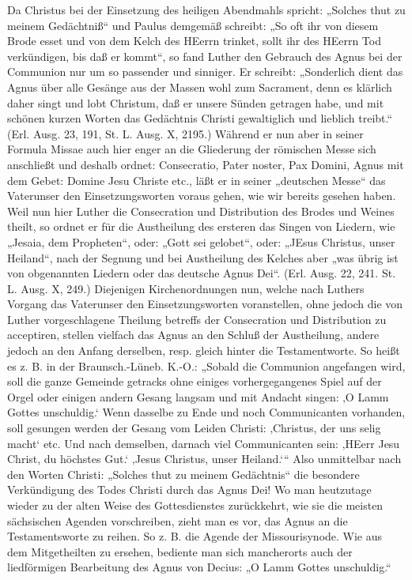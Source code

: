 Da Christus bei der Einsetzung des heiligen Abendmahls spricht: „Solches thut zu meinem Gedächtniß“ und Paulus demgemäß schreibt: „So oft ihr von diesem Brode esset und von dem Kelch des HEerrn trinket, sollt ihr des HEerrn Tod verkündigen, bis daß er kommt“, so fand Luther den Gebrauch des Agnus bei der Communion nur um so passender
und sinniger. Er schreibt: „Sonderlich dient das Agnus über alle Gesänge aus der Massen wohl zum Sacrament, denn es klärlich daher singt und lobt Christum, daß er unsere Sünden getragen habe, und mit schönen kurzen Worten das Gedächtnis Christi gewaltiglich und lieblich treibt.“ (Erl. Ausg. 23, 191, St. L. Ausg. X, 2195.) Während er nun aber in seiner Formula Missae auch hier enger an die Gliederung der römischen Messe sich anschließt und deshalb ordnet: Consecratio, Pater noster, Pax Domini, Agnus mit dem Gebet: Domine Jesu Christe etc., läßt er in seiner „deutschen Messe“ das Vaterunser den Einsetzungsworten voraus gehen, wie wir bereits gesehen haben. Weil nun hier Luther die Consecration und Distribution des Brodes und Weines theilt, so ordnet er für die Austheilung des ersteren das Singen von Liedern, wie „Jesaia, dem Propheten“, oder: „Gott sei gelobet“, oder: „JEsus Christus, unser Heiland“, nach der Segnung und bei Austheilung des Kelches aber „was übrig ist von obgenannten Liedern oder das deutsche Agnus Dei“. (Erl. Ausg. 22, 241. St. L. Ausg. X, 249.) Diejenigen Kirchenordnungen nun, welche nach Luthers Vorgang das Vaterunser den Einsetzungsworten voranstellen, ohne jedoch die von Luther vorgeschlagene Theilung betreffs der Consecration und Distribution zu acceptiren, stellen vielfach das Agnus an den Schluß der Austheilung, andere jedoch an den Anfang derselben, resp. gleich hinter die Testamentworte. So heißt es z. B. in der Braunsch.-Lüneb. K.-O.: „Sobald die Communion angefangen wird, soll die ganze Gemeinde getracks ohne einiges vorhergegangenes Spiel auf der Orgel oder einigen andern Gesang langsam und mit Andacht singen: ‚O Lamm Gottes unschuldig.‘ Wenn dasselbe zu Ende und noch Communicanten vorhanden, soll gesungen werden der Gesang vom Leiden Christi: ‚Christus, der uns selig macht‘ etc. Und nach demselben, darnach viel Communicanten sein: ‚HEerr Jesu Christ, du höchstes Gut.‘ ‚Jesus Christus, unser Heiland.‘“ Also unmittelbar nach den Worten Christi: „Solches thut zu meinem Gedächtnis“ die besondere Verkündigung des Todes Christi durch das Agnus Dei! Wo man heutzutage wieder zu der alten Weise des Gottesdienstes zurückkehrt, wie sie die meisten sächsischen Agenden vorschreiben, zieht man es vor, das Agnus an die Testamentsworte zu reihen. So z. B. die Agende der Missourisynode. Wie aus dem Mitgetheilten zu ersehen, bediente man sich mancherorts auch der liedförmigen Bearbeitung des Agnus von Decius: „O Lamm Gottes unschuldig.“

